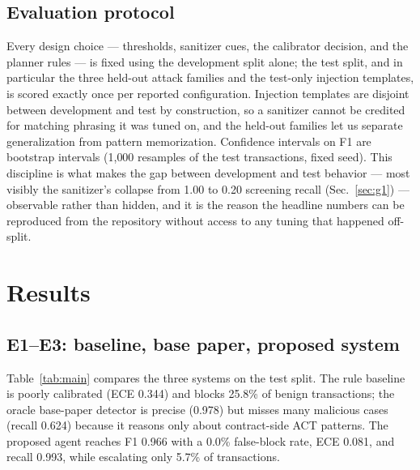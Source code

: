 \documentclass[conference]{IEEEtran}
\begin{document}
\subsection{Evaluation protocol}
Every design choice --- thresholds, sanitizer cues, the calibrator decision, and the
planner rules --- is fixed using the development split alone; the test split, and in
particular the three held-out attack families and the test-only injection templates,
is scored exactly once per reported configuration. Injection templates are disjoint
between development and test by construction, so a sanitizer cannot be credited for
matching phrasing it was tuned on, and the held-out families let us separate
generalization from pattern memorization. Confidence intervals on F1 are bootstrap
intervals (1{,}000 resamples of the test transactions, fixed seed). This discipline is what
makes the gap between development and test behavior --- most visibly the sanitizer's
collapse from 1.00 to 0.20 screening recall (Sec.~\ref{sec:g1}) --- observable rather
than hidden, and it is the reason the headline numbers can be reproduced from the
repository without access to any tuning that happened off-split.

\section{Results}
\subsection{E1--E3: baseline, base paper, proposed system}
Table~\ref{tab:main} compares the three systems on the test split. The rule baseline
is poorly calibrated (ECE 0.344) and blocks 25.8\% of benign transactions; the
oracle base-paper detector is precise (0.978) but misses many malicious cases
(recall 0.624) because it reasons only about contract-side ACT patterns. The
proposed agent reaches F1 0.966 with a 0.0\% false-block rate, ECE 0.081, and recall
0.993, while escalating only 5.7\% of transactions.
\end{document}
